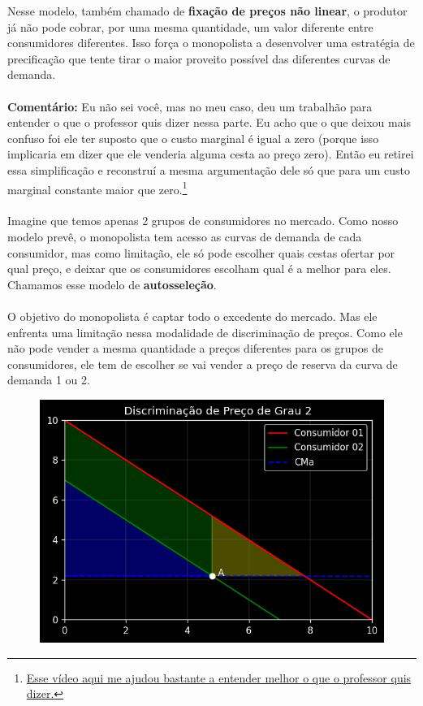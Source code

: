 \documentclass[a4paper,11pt,oneside]{book}
\theoremstyle{definition}
\theoremstyle{break}
\begin{document}
Nesse modelo, também chamado de \textbf{fixação de preços não linear}, o produtor já não pode cobrar, por uma mesma quantidade, um valor diferente entre consumidores diferentes. Isso força o monopolista a desenvolver uma estratégia de precificação que tente tirar o maior proveito possível das diferentes curvas de demanda.
\\
\\
\textbf{Comentário:} Eu não sei você, mas no meu caso, deu um trabalhão para entender o que o professor quis dizer nessa parte. Eu acho que o que deixou mais confuso foi ele ter suposto que o custo marginal é igual a zero (porque isso implicaria em dizer que ele venderia alguma cesta ao preço zero). Então eu retirei essa simplificação e reconstruí a mesma argumentação dele só que para um custo marginal constante maior que zero.\footnote{\href{https://www.youtube.com/watch?v=OBgziVdHH8w}{Esse vídeo aqui me ajudou bastante a entender melhor o que o professor quis dizer.}}
\\
\\
Imagine que temos apenas 2 grupos de consumidores no mercado. Como nosso modelo prevê, o monopolista tem acesso as curvas de demanda de cada consumidor, mas como limitação, ele só pode escolher quais cestas ofertar por qual preço, e deixar que os consumidores escolham qual é a melhor para eles. Chamamos esse modelo de \textbf{autosseleção}.
\\
\\
O objetivo do monopolista é captar todo o excedente do mercado. Mas ele enfrenta uma limitação nessa modalidade de discriminação de preços. Como ele não pode vender a mesma quantidade a preços diferentes para os grupos de consumidores, ele tem de escolher se vai vender a preço de reserva da curva de demanda 1 ou 2.

\begin{figure}[H]
\centering
\includegraphics[scale=0.8]{cap26_3-discriminacao_grau2_1.png}
\end{figure}
\end{document}
